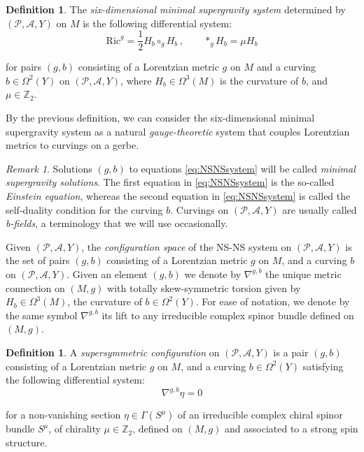 \documentclass[10pt,a4paper,twoside,reqno]{amsart}
\theoremstyle{plain}
\theoremstyle{definition}
\newtheorem{definition}[thm]{Definition}
\theoremstyle{remark}
\newtheorem{remark}[thm]{Remark}
\def\Z{\mathbb{Z}}
\def\cA{\mathcal{A}}
\def\cP{\mathcal{P}}
\def\cP{\mathcal{P}}
\def\Ric{\mathrm{Ric}}
\begin{document}
\begin{definition}
\label{label:NSNSsystem}
The \emph{six-dimensional minimal supergravity system} determined by $(\cP,\cA,Y)$ on $M$ is the following differential system:
\begin{equation}
\label{eq:NSNSsystem}
\Ric^g =  \frac{1}{2} H_b \circ_g H_b \, , \qquad \ast_g H_b = \mu H_b 
\end{equation}
 	
\noindent
for pairs $(g,b)$ consisting of a Lorentzian metric $g$ on $M$ and a curving $b\in \Omega^2(Y)$ on $(\cP,\cA,Y)$, where $H_b\in \Omega^3(M)$ is the curvature of $b$, and $\mu\in\Z_2$.
\end{definition}
 
\noindent
By the previous definition, we can consider the six-dimensional minimal supergravity system as a natural \emph{gauge-theoretic} system that couples Lorentzian metrics to curvings on a gerbe.

\begin{remark}
Solutions $(g,b)$ to equations \eqref{eq:NSNSsystem} will be called \emph{minimal supergravity solutions}. The first equation in \eqref{eq:NSNSsystem} is the so-called \emph{Einstein equation}, whereas the second equation in \eqref{eq:NSNSsystem} is called the self-duality condition for the curving $b$. Curvings on $(\cP,\cA,Y)$ are usually called \emph{b-fields}, a terminology that we will use occasionally. 
\end{remark}
 
\noindent
Given $(\cP,\cA,Y)$, the \emph{configuration space} of the NS-NS system on $(\cP,\cA,Y)$ is the set of pairs $(g,b)$ consisting of a Lorentzian metric $g$ on $M$, and a curving $b$ on $(\cP,\cA,Y)$. Given an element $(g,b)$ we denote by $\nabla^{g,b}$ the unique metric connection on $(M,g)$ with totally skew-symmetric torsion given by $H_b\in \Omega^3(M)$, the curvature of $b\in\Omega^2(Y)$. For ease of notation, we denote by the same symbol $\nabla^{g,b}$ its lift to any irreducible complex spinor bundle defined on $(M,g)$.

\begin{definition}
A \emph{supersymmetric configuration} on $(\cP,\cA,Y)$ is a pair $(g,b)$ consisting of a Lorentzian metric $g$ on $M$, and a curving $b\in \Omega^2(Y)$ satisfying the following differential system:
\begin{equation}
\label{eq:susyparallel}
\nabla^{g,b} \eta = 0
\end{equation}
	
\noindent
for a non-vanishing section $\eta\in\Gamma(S^{\mu})$ of an irreducible complex chiral spinor bundle $S^{\mu}$, of chirality $\mu\in \mathbb{Z}_2$, defined on $(M,g)$ and associated to a strong spin structure.
\end{definition}
\end{document}

